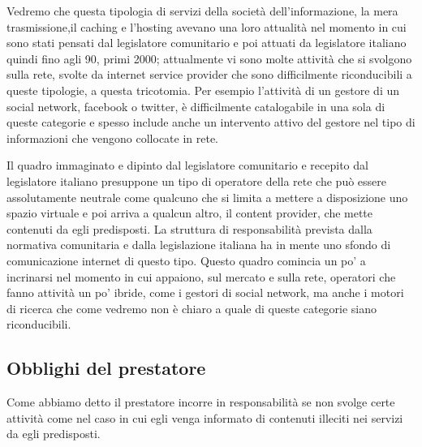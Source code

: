 Vedremo che questa tipologia di servizi della società dell'informazione, la mera trasmissione,il caching e l'hosting avevano una loro attualità nel momento in cui sono stati pensati dal legislatore comunitario e poi attuati da legislatore italiano quindi fino agli 90, primi 2000; attualmente vi sono molte attività che si svolgono sulla rete, svolte da internet service provider che sono difficilmente riconducibili a queste tipologie, a questa tricotomia. Per esempio l'attività di un gestore di un social network, facebook o twitter, è difficilmente catalogabile in una sola di queste categorie e spesso include anche un intervento attivo del gestore nel tipo di informazioni che vengono collocate in rete. 

Il quadro immaginato e dipinto dal legislatore comunitario e recepito dal legislatore italiano presuppone un tipo di operatore della rete che può essere assolutamente neutrale come qualcuno che si limita a mettere a disposizione uno spazio virtuale e poi arriva a qualcun altro, il content provider, che mette contenuti da egli predisposti. La struttura di responsabilità prevista dalla normativa comunitaria e dalla legislazione italiana ha in mente uno sfondo di comunicazione internet di questo tipo. Questo quadro comincia un po' a incrinarsi nel momento in cui appaiono, sul mercato e sulla rete, operatori che fanno attività un po' ibride, come i gestori di social network, ma anche i motori di ricerca che come vedremo non è chiaro a quale di queste categorie siano riconducibili. 

\subsection{Obblighi del prestatore}

Come abbiamo detto il prestatore incorre in responsabilità se non svolge certe attività come nel caso in cui egli venga informato di contenuti illeciti nei servizi da egli predisposti. 

